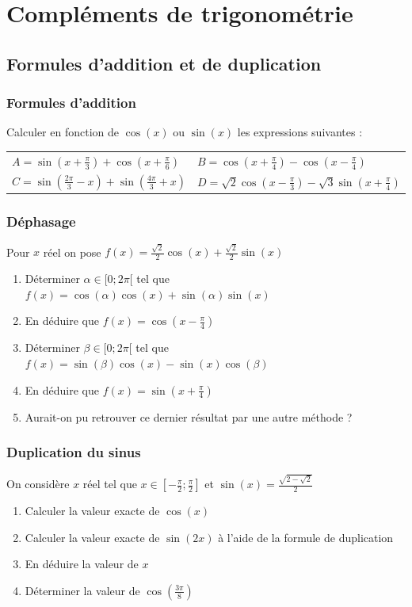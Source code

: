 \documentclass[oneside,12pt]{book}          %
\begin{document}
\chapter{Compléments de trigonométrie}
\newpage

\section{Formules d'addition et de duplication}

\subsection{Formules d'addition}
Calculer en fonction de $\cos(x)$ ou $\sin(x)$ les expressions suivantes :

\begin{tabular}{p{} p{}}
	$A=\sin(x+\frac{\pi}{3})+\cos(x+\frac{\pi}{6})$ & $B=\cos(x+\frac{\pi}{4})-\cos(x-\frac{\pi}{4})$ \\
	$C=\sin(\frac{2\pi}{3}-x)+\sin(\frac{4\pi}{3}+x)$ & $D=\sqrt{2}\cos(x-\frac{\pi}{3})-\sqrt{3}\sin(x+\frac{\pi}{4})$
\end{tabular}



\subsection{Déphasage}
Pour $x$ réel on pose $f(x)=\frac{\sqrt{2}}{2}\cos(x)+\frac{\sqrt{2}}{2}\sin(x)$
\begin{enumerate}
	\item Déterminer $\alpha\in[0;2\pi[$ tel que $f(x)=\cos(\alpha)\cos(x)+\sin(\alpha)\sin(x)$
	\item En déduire que $f(x)=\cos\left(x-\frac{\pi}{4}\right)$
	\item Déterminer $\beta\in[0;2\pi[$ tel que $f(x)=\sin(\beta)\cos(x)-\sin(x)\cos(\beta)$
	\item En déduire que $f(x)=\sin\left(x+\frac{\pi}{4}\right)$
	\item Aurait-on pu retrouver ce dernier résultat par une autre méthode ?
\end{enumerate}



\subsection{Duplication du sinus}
On considère $x$ réel tel que $x\in [-\frac{\pi}{2};\frac{\pi}{2}]$ et $\sin(x)=\frac{\sqrt{2-\sqrt{2}}}{2}$ 
\begin{enumerate}
    \item Calculer la valeur exacte de $\cos(x)$
    \item Calculer la valeur exacte de $\sin(2x)$ à l'aide de la formule de duplication
    \item En déduire la valeur de $x$
    \item Déterminer la valeur de $\cos\left(\frac{3\pi}{8}\right)$
\end{enumerate}
\end{document}
